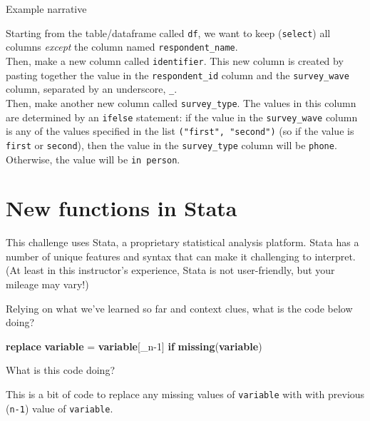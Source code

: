 \documentclass[
]{book}
\newenvironment{Shaded}{\begin{snugshade}}{\end{snugshade}}
\newcommand{\DataTypeTok}[1]{\textcolor[rgb]{0.13,0.29,0.53}{#1}}
\newcommand{\FunctionTok}[1]{\textcolor[rgb]{0.13,0.29,0.53}{\textbf{#1}}}
\newcommand{\KeywordTok}[1]{\textcolor[rgb]{0.13,0.29,0.53}{\textbf{#1}}}
\newcommand{\NormalTok}[1]{#1}
\begin{document}
Example narrative

Starting from the table/dataframe called \texttt{df}, we want to keep (\texttt{select}) all columns \emph{except} the column named \texttt{respondent\_name}.\\

Then, make a new column called \texttt{identifier}. This new column is created by pasting together the value in the \texttt{respondent\_id} column and the \texttt{survey\_wave} column, separated by an underscore, \texttt{\_}.\\

Then, make another new column called \texttt{survey\_type}. The values in this column are determined by an \texttt{ifelse} statement: if the value in the \texttt{survey\_wave} column is any of the values specified in the list \texttt{("first",\ "second")} (so if the value is \texttt{first} or \texttt{second}), then the value in the \texttt{survey\_type} column will be \texttt{phone}. Otherwise, the value will be \texttt{in\ person}.\\

\hfill\break

\section{New functions in Stata}\label{new-functions-in-stata}

This challenge uses Stata, a proprietary statistical analysis platform. Stata has a number of unique features and syntax that can make it challenging to interpret. (At least in this instructor's experience, Stata is not user-friendly, but your mileage may vary!)

Relying on what we've learned so far and context clues, what is the code below doing?

\begin{Shaded}
\begin{Highlighting}[]
\KeywordTok{replace} \KeywordTok{variable}\NormalTok{ = }\KeywordTok{variable}\NormalTok{[}\DataTypeTok{\_n}\NormalTok{{-}1] }\KeywordTok{if} \FunctionTok{missing}\NormalTok{(}\KeywordTok{variable}\NormalTok{)}
\end{Highlighting}
\end{Shaded}

What is this code doing?

This is a bit of code to replace any missing values of \texttt{variable} with with previous (\texttt{n-1}) value of \texttt{variable}.
\end{document}
